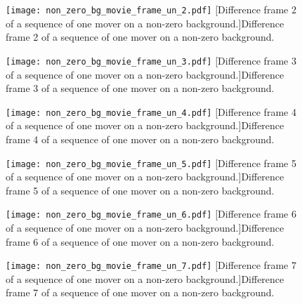 \begin{figure}[!ht]
	\centering
	\texttt{[image: non\_zero\_bg\_movie\_frame\_un\_2.pdf]}
	[Difference frame 2 of a sequence of one mover on a non-zero background.]{Difference frame 2 of a sequence of one mover on a non-zero background.}
	\label{fig:non_zero_bg_movie_frame_un_2}
\end{figure}

\begin{figure}[!ht]
	\centering
	\texttt{[image: non\_zero\_bg\_movie\_frame\_un\_3.pdf]}
	[Difference frame 3 of a sequence of one mover on a non-zero background.]{Difference frame 3 of a sequence of one mover on a non-zero background.}
	\label{fig:non_zero_bg_movie_frame_un_3}
\end{figure}

\clearpage

\begin{figure}[!ht]
	\centering
	\texttt{[image: non\_zero\_bg\_movie\_frame\_un\_4.pdf]}
	[Difference frame 4 of a sequence of one mover on a non-zero background.]{Difference frame 4 of a sequence of one mover on a non-zero background.}
	\label{fig:non_zero_bg_movie_frame_un_3}
\end{figure}

\begin{figure}[!ht]
	\centering
	\texttt{[image: non\_zero\_bg\_movie\_frame\_un\_5.pdf]}
	[Difference frame 5 of a sequence of one mover on a non-zero background.]{Difference frame 5 of a sequence of one mover on a non-zero background.}
	\label{fig:non_zero_bg_movie_frame_un_3}
\end{figure}

\begin{figure}[!ht]
	\centering
	\texttt{[image: non\_zero\_bg\_movie\_frame\_un\_6.pdf]}
	[Difference frame 6 of a sequence of one mover on a non-zero background.]{Difference frame 6 of a sequence of one mover on a non-zero background.}
	\label{fig:non_zero_bg_movie_frame_un_3}
\end{figure}

\clearpage

\begin{figure}[!ht]
	\centering
	\texttt{[image: non\_zero\_bg\_movie\_frame\_un\_7.pdf]}
	[Difference frame 7 of a sequence of one mover on a non-zero background.]{Difference frame 7 of a sequence of one mover on a non-zero background.}
	\label{fig:non_zero_bg_movie_frame_un_3}
\end{figure}

